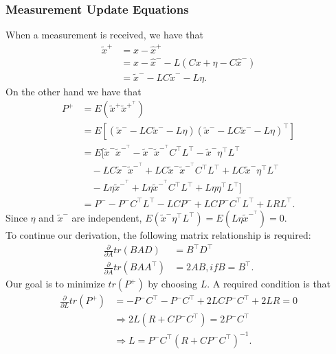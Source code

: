 \subsubsection{Measurement Update Equations}
When a measurement is received, we have that
\begin{align*}
\tilde{x}^+&= x-\hat{x}^+\\
		   &= x-\hat{x}^- -L(Cx+\eta-C\hat{x}^-)\\
		   &= \tilde{x}^- -LC\tilde{x}^- -L\eta.\
\end{align*}
On the other hand we have that
\begin{align} \label{eq:P_posteriori}
P^+ &= E(\tilde{x}^+\tilde{x}^{+^\top}) \nonumber\\
	&= E[(\tilde{x}^- -LC\tilde{x}^- -L\eta)(\tilde{x}^- -LC\tilde{x}^- -L\eta)^\top] \nonumber\\
	&= E[\tilde{x}^-\tilde{x}^{-^\top}-\tilde{x}^-\tilde{x}^{-^\top}C^\top L^\top-\tilde{x}^-\eta^\top L^\top \nonumber\\
	& \quad  -LC\tilde{x}^-\tilde{x}^{-^\top}+LC\tilde{x}^-\tilde{x}^{-^\top}C^\top L^\top+LC\tilde{x}^-\eta^\top L^\top \nonumber\\
	& \quad  -L\eta\tilde{x}^{-^\top}+L\eta\tilde{x}^{-^\top}C^\top L^\top+L\eta\eta^\top L^\top] \nonumber\\
	&= P^- -P^-C^\top L^\top-LCP^-+LCP^-C^\top L^\top+LRL^\top.
\end{align}
Since \begin{math} \eta  \end{math} and \begin{math} \tilde{x}^-  \end{math} are independent, \begin{math} E(\tilde{x}^-\eta^\top L^\top)=E(L\eta\tilde{x}^{-^\top})=0  \end{math}. \\
To continue our derivation, the following matrix relationship is required:
\begin{align*}
\frac{\partial}{\partial A}tr(BAD)&=B^\top D^\top \\
\frac{\partial}{\partial A}tr(BAA^\top)&=2AB, if B = B^\top.
\end{align*}
Our goal is to minimize \begin{math} tr(P^+)  \end{math} by choosing \begin{math} L  \end{math}. A required condition is that
\begin{align*}
\frac{\partial}{\partial L}tr(P^+)&=-P^-C^\top -P^-C^\top + 2LCP^-C^\top +2LR=0\\
&\Rightarrow 2L(R+CP^-C^\top)=2P^-C^\top \\
&\Rightarrow L = P^-C^\top (R+CP^-C^\top)^{-1}.
\end{align*}

